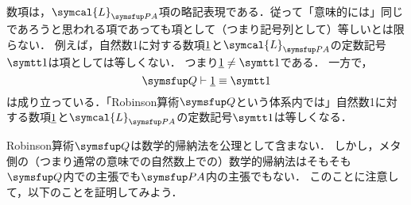 \begin{Note}
	数項は，\(\symcal{L}_{\PA}\)項の略記表現である．従って「意味的には」同じであろうと思われる項であっても項として（つまり記号列として）等しいとは限らない．
	例えば，自然数1に対する数項\(\underline{1}\)と\(\symcal{L}_{\PA}\)の定数記号\(\obj{1}\)は項としては等しくない．
	つまり\(\numeral{1} \neq \obj{1}\)である．
	一方で，
	\begin{equation}
		\Robinson \provable \numeral{1} \objeq \obj{1}
		\label{eq:robinson1numeric}
	\end{equation}
	は成り立っている．「Robinson算術\(\Robinson\)という体系内では」自然数1に対する数項\(\underline{1}\)と\(\symcal{L}_{\PA}\)の定数記号\(\obj{1}\)は等しくなる．
\end{Note}


Robinson算術\(\Robinson\)は数学的帰納法を公理として含まない．
しかし，メタ側の（つまり通常の意味での自然数上での）数学的帰納法はそもそも\(\Robinson\)内での主張でも\(\PA\)内の主張でもない．
このことに注意して，以下のことを証明してみよう．

